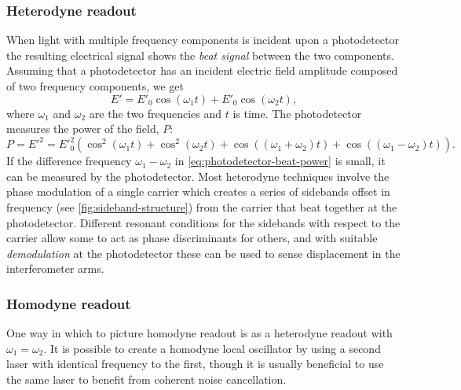 \subsubsection{Heterodyne readout}
When light with multiple frequency components is incident upon a photodetector the resulting electrical signal shows the \emph{beat signal} between the two components. Assuming that a photodetector has an incident electric field amplitude composed of two frequency components, we get~\cite{Freise2010}
\begin{equation}
  E' = E'_0 \cos \left( \omega_1 t \right) + E'_0 \cos \left( \omega_2 t \right),
\end{equation}
where $\omega_1$ and $\omega_2$ are the two frequencies and $t$ is time. The photodetector measures the power of the field, $P$:
\begin{equation}
  \label{eq:photodetector-beat-power}
  P = {E'}^2 = {E'}_0^2 \left( \cos^2 \left( \omega_1 t \right) + \cos^2 \left( \omega_2 t \right) + \cos \left( \left( \omega_1 + \omega_2 \right) t \right) + \cos \left( \left( \omega_1 - \omega_2 \right) t \right) \right).
\end{equation}
If the difference frequency $\omega_1 - \omega_2$ in \cref{eq:photodetector-beat-power} is small, it can be measured by the photodetector. Most heterodyne techniques involve the phase modulation of a single carrier which creates a series of sidebands offset in frequency (see \cref{fig:sideband-structure}) from the carrier that beat together at the photodetector. Different resonant conditions for the sidebands with respect to the carrier allow some to act as phase discriminants for others, and with suitable \emph{demodulation} at the photodetector these can be used to sense displacement in the interferometer arms.

\subsubsection{\label{sec:homodyne-readout}Homodyne readout}
One way in which to picture homodyne readout is as a heterodyne readout with $\omega_1 = \omega_2$. It is possible to create a homodyne local oscillator by using a second laser with identical frequency to the first, though it is usually beneficial to use the same laser to benefit from coherent noise cancellation.

